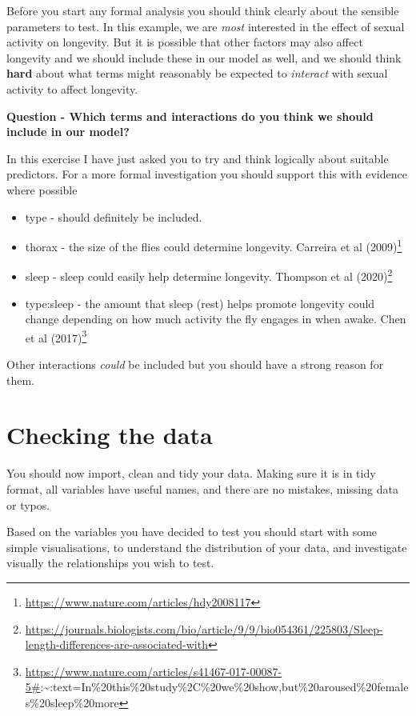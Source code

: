 \documentclass[
]{book}
\begin{document}
Before you start any formal analysis you should think clearly about the sensible parameters to test. In this example, we are \emph{most} interested in the effect of sexual activity on longevity. But it is possible that other factors may also affect longevity and we should include these in our model as well, and we should think \textbf{hard} about what terms might reasonably be expected to \emph{interact} with sexual activity to affect longevity.

\textbf{Question - Which terms and interactions do you think we should include in our model?}

In this exercise I have just asked you to try and think logically about suitable predictors. For a more formal investigation you should support this with evidence where possible

\begin{itemize}
\item
  type - should definitely be included.
\item
  thorax - the size of the flies could determine longevity. Carreira et al (2009)\footnote{\url{https://www.nature.com/articles/hdy2008117}}
\item
  sleep - sleep could easily help determine longevity. Thompson et al (2020)\footnote{\url{https://journals.biologists.com/bio/article/9/9/bio054361/225803/Sleep-length-differences-are-associated-with}}
\item
  type:sleep - the amount that sleep (rest) helps promote longevity could change depending on how much activity the fly engages in when awake. Chen et al (2017)\footnote{\url{https://www.nature.com/articles/s41467-017-00087-5\#}:\textasciitilde:text=In\%20this\%20study\%2C\%20we\%20show,but\%20aroused\%20females\%20sleep\%20more}
\end{itemize}

Other interactions \emph{could} be included but you should have a strong reason for them.

\hypertarget{checking-the-data}{%
\section{Checking the data}\label{checking-the-data}}

You should now import, clean and tidy your data. Making sure it is in tidy format, all variables have useful names, and there are no mistakes, missing data or typos.

Based on the variables you have decided to test you should start with some simple visualisations, to understand the distribution of your data, and investigate visually the relationships you wish to test.
\end{document}
